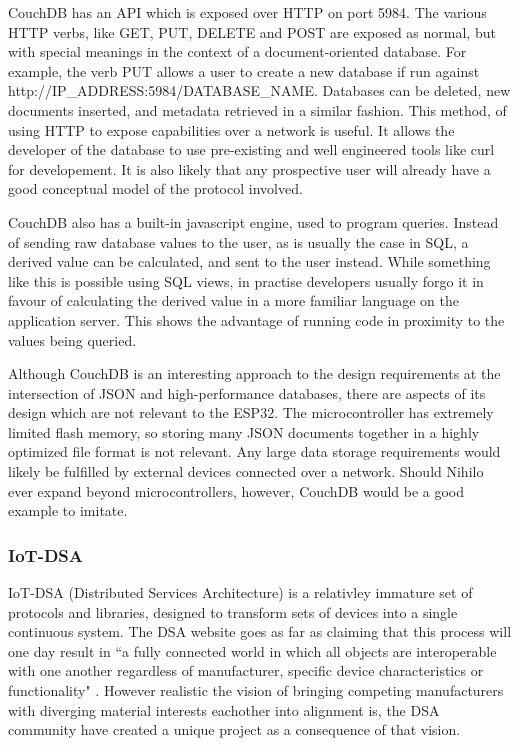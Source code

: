 \documentclass{article}
\begin{document}
CouchDB has an API which is exposed over HTTP on port 5984. The various HTTP verbs, like GET, PUT, DELETE and POST are exposed as normal, but with special meanings in the context of a document-oriented database. For example, the verb PUT allows a user to create a new database if run against http://IP\_ADDRESS:5984/DATABASE\_NAME. Databases can be deleted, new documents inserted, and metadata retrieved in a similar fashion. This method, of using HTTP to expose capabilities over a network is useful. It allows the developer of the database to use pre-existing and well engineered tools like curl for developement. It is also likely that any prospective user will already have a good conceptual model of the protocol involved.

CouchDB also has a built-in javascript engine, used to program queries. Instead of sending raw database values to the user, as is usually the case in SQL, a derived value can be calculated, and sent to the user instead. While something like this is possible using SQL views, in practise developers usually forgo it in favour of calculating the derived value in a more familiar language on the application server. This shows the advantage of running code in proximity to the values being queried.

Although CouchDB is an interesting approach to the design requirements at the intersection of JSON and high-performance databases, there are aspects of its design which are not relevant to the ESP32. The microcontroller has extremely limited flash memory, so storing many JSON documents together in a highly optimized file format is not relevant. Any large data storage requirements would likely be fulfilled by external devices connected over a network. Should Nihilo ever expand beyond microcontrollers, however, CouchDB would be a good example to imitate.

\subsubsection{IoT-DSA}

IoT-DSA (Distributed Services Architecture) is a relativley immature set of protocols and libraries,  designed to transform sets of devices into a single continuous system. The DSA website goes as far as claiming that this process will one day result in ``a fully connected world in which all objects are interoperable with one another regardless of manufacturer, specific device characteristics or functionality" \cite{dsa}. However realistic the vision of bringing competing manufacturers with diverging material interests eachother into alignment is, the DSA community have created a unique project as a consequence of that vision.
\end{document}
